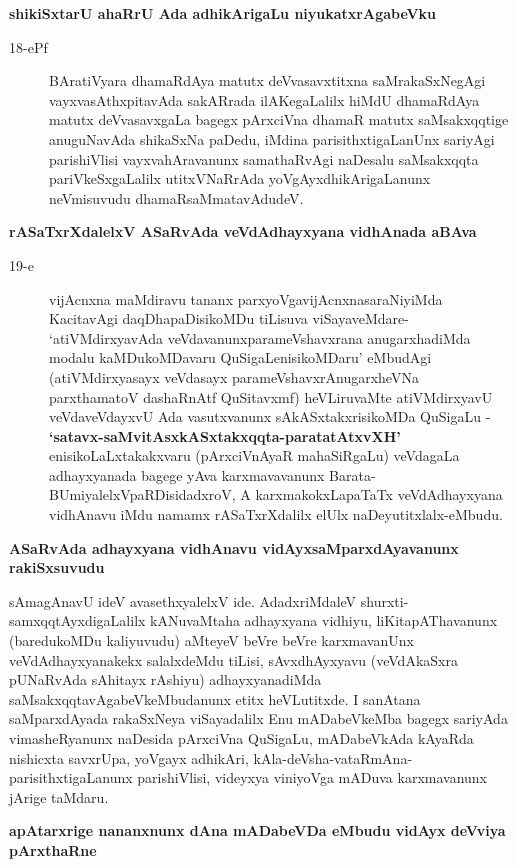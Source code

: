 {\noindent
{\large\bf shikiSxtarU ahaRrU Ada adhikArigaLu niyukatxrAgabeVku}}\label{page47b}
\begin{description}
\item[18-ePf] BAratiVyara dhamaRdAya matutx deVvasavxtitxna saMrakaSxNe\-gAgi vayxvasAthxpitavAda sakAR\-rada ilAKegaLalilx hiMdU dhamaRdAya matutx deVvasavxgaLa bagegx pArxciVna dhamaR matutx saMsakxqq\-tige anuguNavAda shikaSxNa paDedu, iMdina parisithxtigaLanUnx sariyAgi parishiVlisi vayxva\-hAra\-vanunx samathaRvAgi naDesalu saMsakxqqta pariVkeSxgaLalilx utitxVNaRrAda yoVgAyxdhikArigaLanunx neVmisu\-vudu dhamaRsaMmatavAdudeV.
\end{description}
{\noindent
{\large\bf rASaTxrXdalelxV ASaRvAda veVdAdhayxyana vidhAnada aBAva}}\label{page47a}
\begin{description}
\item[19-e] vijAcnxna maMdiravu tananx parxyoVgavijAcnxnasaraNiyiMda KacitavAgi daqDha\-paDisikoMDu tiLisuva viSayaveMdare- `atiVMdirxyavAda veVdavanunx\break parameVshavxrana anugarxhadiMda modalu kaMDu\-koMDavaru QuSigaLenisi\break\-koMDaru' eMbudAgi (atiVMdirxyasayx veVdasayx\label{47a} parameVshavxrAnu\-garxheVNa parxthamatoV dashaRnAtf QuSitavxmf) heVLiruvaMte atiVMdirxyavU veVda\-veVdayxvU Ada vasutx\-vanunx sAkASxtakxrisikoMDa QuSigaLu - {\bf `satavx-saMvitAsxkASx\-takxqqta-paratatAtxvXH'\label{48b}} enisikoLaLxtakakxvaru (pArx\-ciV\-nAyaR mahaSiRgaLu) veVdagaLa adhayxyanada bagege yAva karxmavavanunx Barata-BUmi\-yalelxV\-paR\-Disi\-dadxroV, A karxmakokxLapaTaTx veVdAdhayxyana vidhAnavu iMdu namamx rASaTxrXdalilx elUlx naDeyutitxlalx-eMbudu.
\end{description}
{\noindent
{\large\bf ASaRvAda adhayxyana vidhAnavu vidAyxsaMparxdAyavanunx rakiSxsuvudu}}\label{page48}
\medskip

\noindent
sAmagAnavU ideV avasethxyalelxV ide. AdadxriMdaleV shurxti-samxqqtAyxdigaLalilx kANu\-vaMtaha adhayxyana vidhiyu, liKitapAThavanunx (baredukoMDu kaliyuvudu) aMteyeV beVre beVre karxmavanUnx veVdA\-dhayxya\-nakekx salalx\-deMdu tiLisi, sAvxdhAyxyavu (veVdAkaSxra pUNaRvAda sAhitayx rAshiyu) adhayxyanadiMda saMsakxqqta\-vAga\-beVkeMbu\-danunx etitx heVLutitxde. I sanAtana saMparxdAyada rakaSxNeya viSayadalilx Enu mADa\-beVkeMba bagegx sariyAda vimasheRyanunx naDesida pArxciVna QuSigaLu, mADabeVkAda kAyaRda nishicxta savxrUpa, yoVgayx adhikAri, kAla-deVsha-vataRmAna- parisithxtigaLanunx parishiVlisi, videyxya vini\-yoVga mA\-Duva karxma\-vanunx jArige taMdaru.

{\bigskip
\noindent
{\large\bf apAtarxrige nananxnunx dAna mADabeVDa eMbudu vidAyx deVviya pArxthaRne}}\label{page48a}
\medskip


